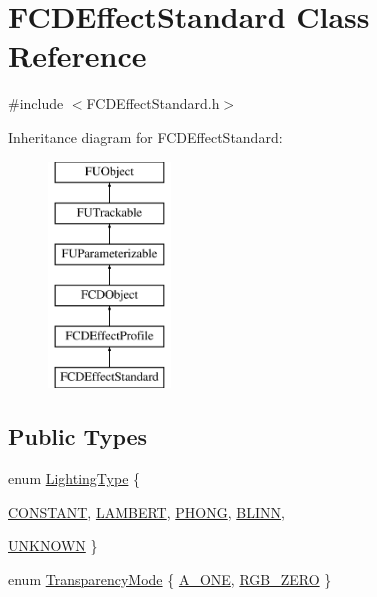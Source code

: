 \hypertarget{classFCDEffectStandard}{
\section{FCDEffectStandard Class Reference}
\label{classFCDEffectStandard}
}


{\ttfamily \#include $<$FCDEffectStandard.h$>$}

Inheritance diagram for FCDEffectStandard:\begin{figure}[H]
\begin{center}
\leavevmode
\includegraphics[height=6.000000cm]{classFCDEffectStandard}
\end{center}
\end{figure}
\subsection*{Public Types}
\begin{DoxyCompactItemize}
\item 
enum \hyperlink{classFCDEffectStandard_a0c8ec2fb06ea05212a4bb140f909b41d}{LightingType} \{ \par
\hyperlink{classFCDEffectStandard_a0c8ec2fb06ea05212a4bb140f909b41da405f6b6e4e09f73969b9566ec39a37cd}{CONSTANT}, 
\hyperlink{classFCDEffectStandard_a0c8ec2fb06ea05212a4bb140f909b41da936fa2b549fcc7833ec86e32a6d26667}{LAMBERT}, 
\hyperlink{classFCDEffectStandard_a0c8ec2fb06ea05212a4bb140f909b41dacdf2c5f91356a6c80fd8d764a433e008}{PHONG}, 
\hyperlink{classFCDEffectStandard_a0c8ec2fb06ea05212a4bb140f909b41da589842bebd4c87def8bf1a65fab074f4}{BLINN}, 
\par
\hyperlink{classFCDEffectStandard_a0c8ec2fb06ea05212a4bb140f909b41dac081dc5deede6d9e1a8293f556a5bcfc}{UNKNOWN}
 \}
\item 
enum \hyperlink{classFCDEffectStandard_a9e749ea44e9152c5671985b3e9a7c9a5}{TransparencyMode} \{ \hyperlink{classFCDEffectStandard_a9e749ea44e9152c5671985b3e9a7c9a5a68c1c4c107542260f18ff3ef04c46762}{A\_\-ONE}, 
\hyperlink{classFCDEffectStandard_a9e749ea44e9152c5671985b3e9a7c9a5a0da1b910a6c9fb9553dd131a56295411}{RGB\_\-ZERO}
 \}
\end{DoxyCompactItemize}
